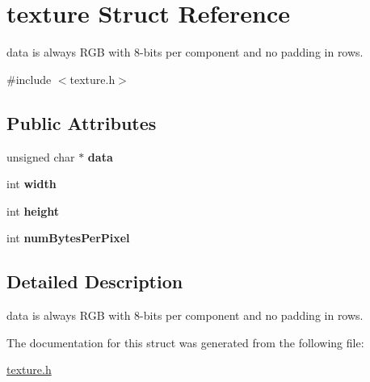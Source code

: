 \hypertarget{structtexture}{}\section{texture Struct Reference}
\label{structtexture}


data is always R\+GB with 8-\/bits per component and no padding in rows.  




{\ttfamily \#include $<$texture.\+h$>$}

\subsection*{Public Attributes}
\begin{DoxyCompactItemize}
\item 
\mbox{\label{structtexture_a1adde5ed6e5e51d7987713b9937c3a36}} 
unsigned char $\ast$ {\bfseries data}
\item 
\mbox{\label{structtexture_a4a3a10c13e71ede50448d2206b19b3f0}} 
int {\bfseries width}
\item 
\mbox{\label{structtexture_a349e2a1068e65f1520a4a4c0af28e28e}} 
int {\bfseries height}
\item 
\mbox{\label{structtexture_ab7699885b4439c13cb908d43c9b27d38}} 
int {\bfseries num\+Bytes\+Per\+Pixel}
\end{DoxyCompactItemize}


\subsection{Detailed Description}
data is always R\+GB with 8-\/bits per component and no padding in rows. 

The documentation for this struct was generated from the following file\+:\begin{DoxyCompactItemize}
\item 
\hyperlink{texture_8h}{texture.\+h}\end{DoxyCompactItemize}
